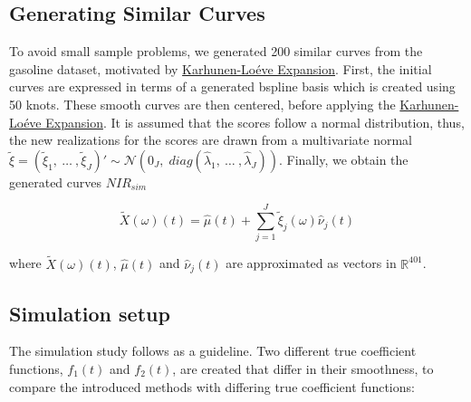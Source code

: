 \documentclass[11pt,twoside,a4paper]{article}
\begin{document}
	
	
	\subsection{Generating Similar Curves}
	To avoid small sample problems, we generated 200 similar curves from the gasoline dataset, motivated by \hyperlink{KL}{Karhunen-Lo\'{e}ve Expansion}. First, the initial curves are expressed in terms of a generated bspline basis which is created using 50 knots. These smooth curves are then centered, before applying the \hyperlink{KL}{Karhunen-Lo\'{e}ve Expansion}. It is assumed that the scores follow a normal distribution, thus, the new realizations for the scores are drawn from a multivariate normal $\tilde{\xi} = \left(\tilde{\xi}_{1},\: \dots \:, \tilde{\xi}_{J}\right)' \sim \mathcal{N}(0_J, \; diag(\hat{\lambda}_1,\: \dots\:, \hat{\lambda}_J))$. Finally, we obtain the generated curves $NIR_{sim}$
	
	
		$$\tilde{X}(\omega)(t) = \hat{\mu}(t) + \sum_{j = 1}^{J} \tilde{\xi}_j(\omega) \hat{\nu}_j(t)$$ 

		where
			$\tilde{X}(\omega)(t)$, $\hat{\mu}(t)$ and $\hat{\nu}_j(t)$ are approximated as vectors in $\mathbb{R}^{401}$.
		
	
    
    \subsection{Simulation setup}
	The simulation study follows \cite{Reiss_2007b} as a guideline. Two different true coefficient functions,  $f_1(t)$ and  $f_2(t)$, are created that differ in their smoothness, to compare the introduced methods with differing true coefficient functions:
	
\end{document}
